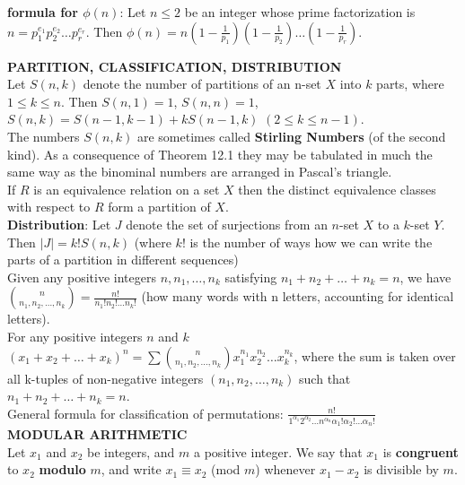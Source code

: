 \documentclass[10pt,landscape]{article}
\begin{document}
\begin{multicols}{4}
\textbf{formula for $\phi(n)$}: Let $n \leq 2$ be an integer whose
prime factorization is $n = p_{1}^{e_{1}}p_{2}^{e_{2}}\dots
p_{r}^{e_{r}}$. Then $\phi (n) = n(1-\frac{1}{p_{1}})(1-
\frac{1}{p_{2}})\dots (1- \frac{1}{p_{r}})$. 

\textbf{PARTITION, CLASSIFICATION, DISTRIBUTION}\\
Let $S(n,k)$ denote the number of partitions of an n-set $X$ into $k$
parts, where $1 \leq k \leq n$. Then $S(n,1) = 1$, $S(n,n) = 1$,
$S(n,k) = S(n-1, k-1) + kS(n-1,k)$ $(2 \leq k \leq n-1)$.\\

The numbers $S(n,k)$ are sometimes called \textbf{Stirling Numbers}
(of the second kind). As a consequence of Theorem 12.1 they may be
tabulated in much the same way as the binominal numbers are arranged
in Pascal's triangle.\\

If $R$ is an equivalence relation on a set $X$ then the distinct
equivalence classes with respect to $R$ form a partition of $X$.\\

\textbf{Distribution}: Let $J$ denote the set of surjections from an
$n$-set $X$ to a $k$-set $Y$. Then $|J| = k!S(n,k)$ (where $k!$ is the
number of ways how we can write the parts of a partition in different
sequences)\\ 

Given any positive integers $n, n_{1}, \dots ,n_{k}$ satisfying
$n_{1} + n_{2} + \dots + n_{k} = n$, we have
$\binom{n}{n_{1},n_{2},\dots,n_{k}}=\frac{n!}{n_{1}!n_{2}!\dots
  n_{k}!}$ (how many words with n letters, accounting for identical
letters).\\


For any positive integers $n$ and $k$ $(x_{1}+ x_{2} + \dots
+ x_{k})^{n} = \sum \binom{n}{n_{1},n_{2}, \dots
  ,n_{k}} x_{1}^{n_{1}} x_{2}^{n_{2}} \dots x_{k}^{n_{k}}$, where the sum
    is taken over all k-tuples of non-negative integers $(n_{1},
    n_{2}, \dots, n_{k})$ such that $n_{1}+n_{2}+ \dots + n_{k} =
    n$.\\

General formula for classification of permutations:
$\frac{n!}{1^{\alpha_{1}}2^{\alpha_{2}}\dots
  n^{\alpha_{n}}\alpha_{1}!\alpha_{2}!\dots \alpha_{n}!}$\\


\textbf{MODULAR ARITHMETIC}\\

Let $x_{1}$ and $x_{2}$ be integers, and $m$ a positive integer. We
say that $x_{1}$ is \textbf{congruent} to $x_{2}$ \textbf{modulo} $m$,
and write $x_{1} \equiv x_{2}$ (mod $m$) whenever $x_{1} - x_{2}$ is
divisible by $m$.\\


\end{multicols}
\end{document}
